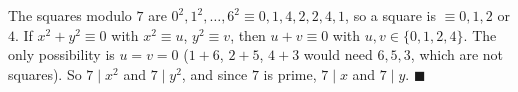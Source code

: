 The squares modulo $7$ are $0^2,1^2,\dots,6^2\equiv0,1,4,2,2,4,1$, so a square is $\equiv0,1,2$ or $4$. If $x^2+y^2\equiv0$ with $x^2\equiv u$, $y^2\equiv v$, then $u+v\equiv0$ with $u,v\in\{0,1,2,4\}$. The only possibility is $u=v=0$ ($1+6$, $2+5$, $4+3$ would need $6,5,3$, which are not squares). So $7\mid x^2$ and $7\mid y^2$, and since $7$ is prime, $7\mid x$ and $7\mid y$. $\blacksquare$
